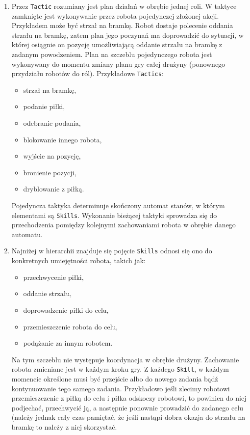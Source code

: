 \begin{enumerate}
  \item Przez \texttt{Tactic} rozumiany jest plan działań w obrębie jednej roli. W taktyce zamknięte jest wykonywanie przez robota pojedynczej złożonej akcji.
  Przykładem może być strzał na bramkę. Robot dostaje polecenie oddania strzału na bramkę, zatem plan jego poczynań ma doprowadzić
 do sytuacji, w której osiągnie on pozycję umożliwiającą oddanie strzału na bramkę z zadanym powodzeniem.
 Plan na szczeblu pojedynczego robota jest wykonywany do momentu zmiany planu gry całej drużyny (ponownego przydziału robotów do ról).
 Przykładowe \texttt{Tactics}:
 \begin{itemize}
  \item strzał na bramkę,
  \item podanie piłki,
  \item odebranie podania,
  \item blokowanie innego robota,
  \item wyjście na pozycję,
  \item bronienie pozycji,
  \item dryblowanie z piłką.
 \end{itemize}
  Pojedyncza taktyka determinuje skończony automat stanów, w którym elementami są \texttt{Skills}. Wykonanie bieżącej taktyki sprowadza się do przechodzenia pomiędzy kolejnymi zachowaniami robota w obrębie
  danego automatu.
  \item Najniżej w hierarchii znajduje się pojęcie \texttt{Skills} odnosi się ono do konkretnych umiejętności robota, takich jak:
    \begin{itemize}
    \item przechwycenie piłki,
    \item oddanie strzału,
    \item doprowadzenie piłki do celu,
    \item przemieszczenie robota do celu,
    \item podążanie za innym robotem.
    \end{itemize}
  Na tym szczeblu nie występuje koordynacja w obrębie drużyny. Zachowanie robota zmieniane jest w każdym kroku gry. Z każdego \texttt{Skill}, w każdym momencie określone musi być przejście
  albo do nowego zadania bądź kontynuowanie tego samego zadania. Przykładowo jeśli zlecimy robotowi przemieszczenie z piłką do celu i piłka 
  odskoczy robotowi, to powinien do niej podjechać, przechwycić ją, a następnie ponownie prowadzić do zadanego celu (należy jednak cały czas pamiętać, że jeśli nastąpi dobra okazja do strzału
na bramkę to należy z niej skorzystać.
\end{enumerate}

